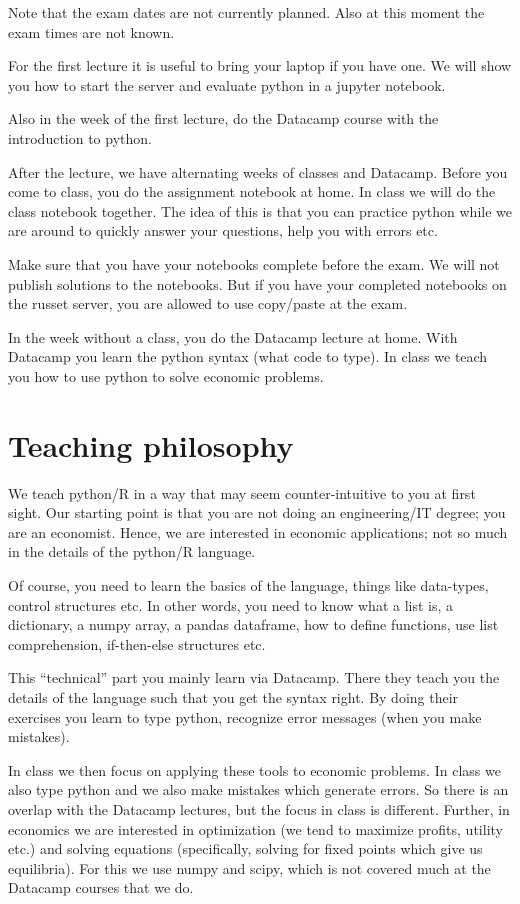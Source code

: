 \documentclass[]{book}
\begin{document}
Note that the exam dates are not currently planned. Also at this moment the exam times are not known.

For the first lecture it is useful to bring your laptop if you have one. We will show you how to start the server and evaluate python in a jupyter notebook.

Also in the week of the first lecture, do the Datacamp course with the introduction to python.

After the lecture, we have alternating weeks of classes and Datacamp. Before you come to class, you do the assignment notebook at home. In class we will do the class notebook together. The idea of this is that you can practice python while we are around to quickly answer your questions, help you with errors etc.

Make sure that you have your notebooks complete before the exam. We will not publish solutions to the notebooks. But if you have your completed notebooks on the russet server, you are allowed to use copy/paste at the exam.

In the week without a class, you do the Datacamp lecture at home. With Datacamp you learn the python syntax (what code to type). In class we teach you how to use python to solve economic problems.

\hypertarget{teaching-philosophy}{%
\section{Teaching philosophy}\label{teaching-philosophy}}

We teach python/R in a way that may seem counter-intuitive to you at first sight. Our starting point is that you are not doing an engineering/IT degree; you are an economist. Hence, we are interested in economic applications; not so much in the details of the python/R language.

Of course, you need to learn the basics of the language, things like data-types, control structures etc. In other words, you need to know what a list is, a dictionary, a numpy array, a pandas dataframe, how to define functions, use list comprehension, if-then-else structures etc.

This ``technical'' part you mainly learn via Datacamp. There they teach you the details of the language such that you get the syntax right. By doing their exercises you learn to type python, recognize error messages (when you make mistakes).

In class we then focus on applying these tools to economic problems. In class we also type python and we also make mistakes which generate errors. So there is an overlap with the Datacamp lectures, but the focus in class is different. Further, in economics we are interested in optimization (we tend to maximize profits, utility etc.) and solving equations (specifically, solving for fixed points which give us equilibria). For this we use numpy and scipy, which is not covered much at the Datacamp courses that we do.
\end{document}
